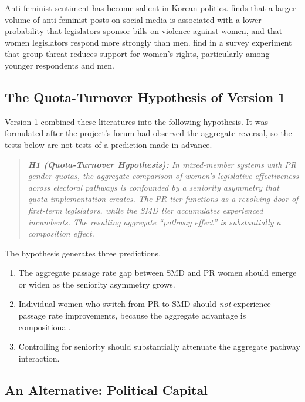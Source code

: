 \documentclass[11pt]{article}
\begin{document}
Anti-feminist sentiment has become salient in Korean politics. \citet{woo2023} finds that a larger volume of anti-feminist posts on social media is associated with a lower probability that legislators sponsor bills on violence against women, and that women legislators respond more strongly than men. \citet{kimlee2025} find in a survey experiment that group threat reduces support for women's rights, particularly among younger respondents and men.

\subsection{The Quota-Turnover Hypothesis of Version 1}
\label{sec:hyp}

Version 1 combined these literatures into the following hypothesis. It was formulated after the project's forum had observed the aggregate reversal, so the tests below are not tests of a prediction made in advance.

\begin{quote}
\textit{\textbf{H1 (Quota-Turnover Hypothesis):} In mixed-member systems with PR gender quotas, the aggregate comparison of women's legislative effectiveness across electoral pathways is confounded by a seniority asymmetry that quota implementation creates. The PR tier functions as a revolving door of first-term legislators, while the SMD tier accumulates experienced incumbents. The resulting aggregate ``pathway effect'' is substantially a composition effect.}
\end{quote}

\noindent The hypothesis generates three predictions.

\begin{enumerate}
\item[\textit{P1.}] The aggregate passage rate gap between SMD and PR women should emerge or widen as the seniority asymmetry grows.
\item[\textit{P2.}] Individual women who switch from PR to SMD should \textit{not} experience passage rate improvements, because the aggregate advantage is compositional.
\item[\textit{P3.}] Controlling for seniority should substantially attenuate the aggregate pathway interaction.
\end{enumerate}

\subsection{An Alternative: Political Capital}
\end{document}
